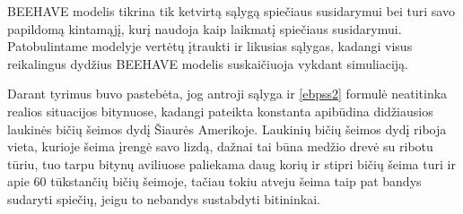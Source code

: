 \documentclass{VUMIFKompMagistrinis}
\begin{document}
BEEHAVE modelis tikrina tik ketvirtą sąlygą spiečiaus susidarymui bei turi savo papildomą kintamąjį, kurį naudoja kaip laikmatį spiečiaus susidarymui. Patobulintame modelyje vertėtų įtraukti ir likusias sąlygas, kadangi visus reikalingus dydžius BEEHAVE modelis suskaičiuoja vykdant simuliaciją.

Darant tyrimus buvo pastebėta, jog antroji sąlyga ir \eqref{ebpss2} formulė neatitinka realios situacijos bitynuose, kadangi pateikta konstanta apibūdina didžiausios laukinės bičių šeimos dydį Šiaurės Amerikoje. Laukinių bičių šeimos dydį riboja vieta, kurioje šeima įrengė savo lizdą, dažnai tai būna medžio drevė su ribotu tūriu, tuo tarpu bitynų aviliuose paliekama daug korių ir stipri bičių šeima turi ir apie 60 tūkstančių bičių šeimoje, tačiau tokiu atveju šeima taip pat bandys sudaryti spiečių, jeigu to nebandys sustabdyti bitininkai.

\end{document}
